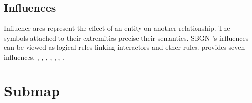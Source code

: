 




\subsection{Influences}\label{sec:influences}

Influence arcs represent the effect of an entity on another relationship. The symbols attached to their extremities precise their semantics. SBGN \ER{}'s influences can be viewed as logical rules linking interactors and other rules. \SBGNERLone{} provides seven influences, , , , , , , .










\section{Submap}\label{sec:submap}

